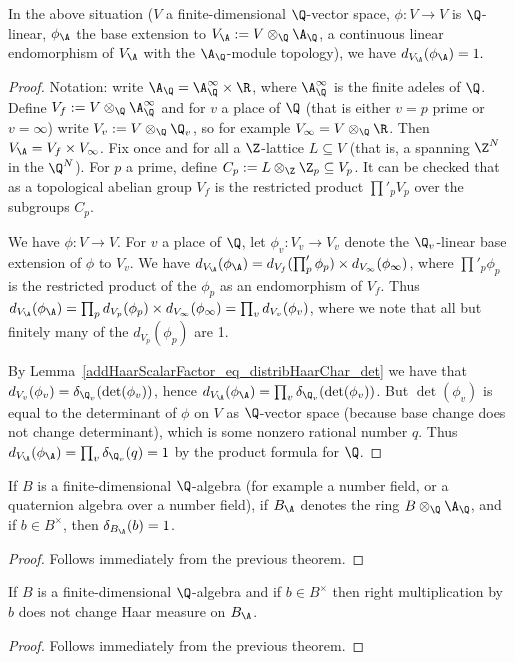  \begin{theorem}
    \label{addHaarScalarFactor_eq_one}
    In the above situation ($V$ a finite-dimensional $\Q$-vector space, $\phi:V\to V$ is $\Q$-linear,
    $\phi_{\A}$ the base extension to $V_{\A}:=V\otimes_{\Q}{\A_{\Q}}$, a continuous linear
    endomorphism of $V_{\A}$ with the $\A_{\Q}$-module topology), we have $d_{V_{\A}}(\phi_{\A})=1.$
  \end{theorem}
  \begin{proof}
    Notation: write $\A_{\Q}=\A_{\Q}^\infty\times\R$, where $\A_{\Q}^\infty$ is the finite adeles of $\Q$.
    Define $V_f:= V\otimes_{\Q}\A_{\Q}^\infty$ and for $v$ a place of $\Q$ (that is either $v=p$ prime
    or $v=\infty$) write $V_v:=V\otimes_{\Q}\Q_v$, so for example $V_\infty=V\otimes_{\Q}\R$.
    Then $V_{\A}=V_f\times V_\infty$. Fix once and for all a $\Z$-lattice $L\subseteq V$
    (that is, a spanning $\Z^N$ in the $\Q^N$).
    For $p$ a prime, define $C_p:=L\otimes_{\Z}\Z_p\subseteq V_p$. It can be checked that
    as a topological abelian group $V_f$ is the restricted product $\prod'_p V_p$ over the
    subgroups $C_p$.

    We have $\phi:V\to V$. For $v$ a place of $\Q$, let $\phi_v:V_v\to V_v$ denote the $\Q_v$-linear
    base extension of $\phi$ to $V_v$. We have $d_{V_{\A}}(\phi_{\A})=d_{V_f}(\prod'_p \phi_p)\times d_{V_\infty}(\phi_\infty)$,
    where $\prod'_p \phi_p$ is the restricted product of the $\phi_p$ as an endomorphism of $V_f$.
    Thus $d_{V_{\A}}(\phi_{\A})=\prod_p d_{V_p}(\phi_p)\times d_{V_\infty}(\phi_\infty)=\prod_v d_{V_v}(\phi_v)$, where
    we note that all but finitely many of the $d_{V_p}(\phi_p)$ are 1.

    By Lemma~\ref{addHaarScalarFactor_eq_distribHaarChar_det} we have that
    $d_{V_v}(\phi_v)=\delta_{\Q_v}(\det(\phi_v))$, hence $d_{V_{\A}}(\phi_{\A})=\prod_v\delta_{\Q_v}(\det(\phi_v))$.
    But $\det(\phi_v)$ is equal to the determinant of $\phi$ on $V$ as $\Q$-vector space (because
    base change does not change determinant),
    which is some nonzero rational number $q$. Thus $d_{V_{\A}}(\phi_{\A})=\prod_v\delta_{\Q_v}(q)=1$
    by the product formula for $\Q$.
  \end{proof}

  \begin{corollary}
    \label{distribHaarCharacter_kernel_tensor_adeleRing}
    If $B$ is a finite-dimensional $\Q$-algebra (for example a number field, or a quaternion algebra over a number field),
    if $B_{\A}$ denotes the ring $B\otimes_{\Q}\A_{\Q}$, and if $b\in B^\times$,
    then $\delta_{B_{\A}}(b)=1$.
  \end{corollary}
  \begin{proof}
    Follows immediately from the previous theorem.
  \end{proof}

  \begin{corollary} If $B$ is a finite-dimensional $\Q$-algebra and
    if $b\in B^\times$ then right multiplication by $b$
    does not change Haar measure on $B_{\A}$.
  \end{corollary}
  \begin{proof}
    Follows immediately from the previous theorem.
  \end{proof}
